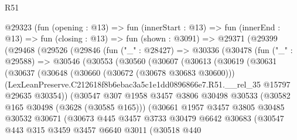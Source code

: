 \begin{lexlean}{R51}
\begin{coremodule}
      @29323
        (fun (opening : @13) =>
        fun (innerStart : @13) =>
        fun (innerEnd : @13) =>
        fun (closing : @13) =>
        fun (shown : @3091) =>
        @29371
          (@29399
            (@29468
              (@29526
                (@29846
                  (fun ("_" : @28427) =>
                  @30336
                    (@30478
                      (fun ("_" : @29588) =>
                      @30546
                        (@30553
                          (@30560
                            (@30607
                              (@30613
                                (@30619
                                  (@30631
                                    (@30637
                                      (@30648
                                        (@30660 (@30672 (@30678 @30683 @30600)))
                                        (LexLeanPreserve.C212618f8b6ebac3a5c1e1dd0896866e7.R51.__rel_35
                                          @15797
                                          @29635
                                          @30354))
                                      (@30547
                                        @307
                                        @1958
                                        @3457
                                        @3806
                                        @30498
                                        @30533
                                        (@30582 @165 @30498 (@3628 (@30585 @165)))
                                        (@30661
                                          @1957
                                          @3457
                                          @3805
                                          @30485
                                          @30532
                                          @30671
                                          (@30673
                                            @445
                                            @3457
                                            @3733
                                            @30479
                                            @6642
                                            @30683
                                            (@30547
                                              @443
                                              @315
                                              @3459
                                              @3457
                                              @6640
                                              @3011
                                              (@30518
                                                @440

\end{coremodule}
\end{lexlean}
